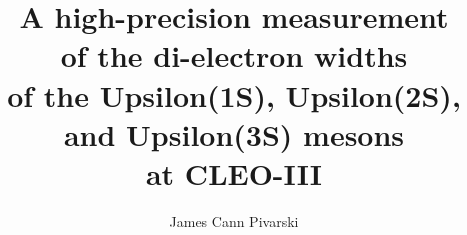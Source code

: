 \documentclass{cornell}
\title{A high-precision measurement \\ of the di-electron widths \\ of the
Upsilon(1S), Upsilon(2S), \\ and Upsilon(3S) mesons \\ at CLEO-III}
\author{James \emc Cann Pivarski}
\begin{document}
\newcommand{\subs}[1]{{\mbox{\scriptsize #1}}}
\newcommand{\inv}{$^{-1}$}
\newcommand{\PM}{$\pm$}
\newcommand{\ups}{$\Upsilon$}
\newcommand{\gee}{$\Gamma_{ee}$}
\newcommand{\us}{$\Upsilon(1S)$}
\newcommand{\uss}{$\Upsilon(2S)$}
\newcommand{\usss}{$\Upsilon(3S)$}
\newcommand{\es}{$\epsilon_{1S}$}
\newcommand{\ess}{$\epsilon_{2S}$}
\newcommand{\esss}{$\epsilon_{3S}$}
\newcommand{\ee}{$e^+e^-$}
\newcommand{\mumu}{$\mu^+\mu^-$}
\newcommand{\tautau}{$\tau^+\tau^-$}
\newcommand{\gamgam}{$\gamma\gamma$}
\newcommand{\gggamma}{$gg\gamma$}
\newcommand{\qqbar}{$q\bar{q}$}
\newcommand{\bee}{${\mathcal B}_{ee}$}
\newcommand{\bmm}{${\mathcal B}_{\mu\mu}$}
\newcommand{\btt}{${\mathcal B}_{\tau\tau}$}
\newcommand{\bcas}{${\mathcal B}_\subs{cas}$}
\newcommand{\geehadtot}{$\Gamma_{ee}\Gamma_\subs{had}/\Gamma_\subs{tot}$}
\newcommand{\twotoone}{$\Upsilon(2S) \to \pi^+\pi^- \Upsilon(1S)$}
\newcommand{\pipi}{$\pi^+\pi^-$}
\newcommand{\evis}{$\epsilon_\subs{vis}$}
\newcommand{\ecuts}{$\epsilon_\subs{cuts}$}
\newcommand{\ebeam}{$E_\subs{beam}$}
\newcommand{\ecm}{$E_\subs{CM}$}
\newcommand{\pmax}{$|\vec{p}_\subs{max}|$}
\newcommand{\visen}{$E_\subs{vis}$}
\newcommand{\dxy}{$d_\subs{XY}$}
\newcommand{\dz}{$d_\subs{Z}$}
\newcommand{\vtd}{$V_{td}$}
\newcommand{\twotrack}{{\tt two-track}}
\newcommand{\hadron}{{\tt hadron}}
\newcommand{\radtau}{{\tt rad-tau}}
\newcommand{\eltrack}{{\tt $e^\pm$-track}}
\newcommand{\barrelbhabha}{{\tt barrel-bhabha}}
\newcommand{\axial}{{\tt AXIAL}}
\newcommand{\stereo}{{\tt STEREO}}
\newcommand{\cblo}{{\tt CBLO}}
\newcommand{\cbmd}{{\tt CBMD}}
\newcommand{\cbhi}{{\tt CBHI}}
\end{document}

